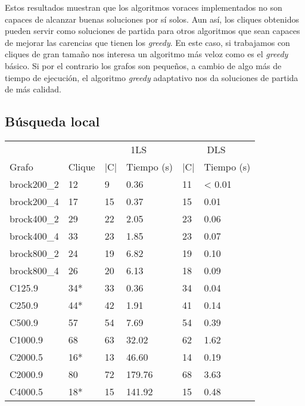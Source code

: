 Estos resultados muestran que los algoritmos voraces implementados no
son capaces de alcanzar buenas soluciones por sí solos. Aun así, los cliques
obtenidos pueden servir como soluciones de partida para otros algoritmos que sean
capaces de mejorar las carencias que tienen los \textit{greedy}. En este caso,
si trabajamos con cliques de gran tamaño nos interesa un algoritmo más veloz como
es el \textit{greedy} básico. Si por el contrario los grafos son pequeños, a cambio de algo
más de tiempo de ejecución, el algoritmo \textit{greedy} adaptativo nos da soluciones de
partida de más calidad.

\subsection{Búsqueda local}

\begin{small}
  \begin{longtable}{l l l l l l}
  \label{table:bl}\\
    & & \multicolumn{2}{c}{1LS} & \multicolumn{2}{c}{DLS} \\ \cline{3-6}
    Grafo              & Clique & |C| & Tiempo (s) & |C| & Tiempo (s) \\ \hline
    \endhead
    \endfoot
    brock200\_2        & 12 & 9 & 0.36 & 11 & < 0.01   \\ \hline
    brock200\_4        & 17 & 15 & 0.37 & 15 & 0.01   \\ \hline
    brock400\_2        & 29 & 22 & 2.05 & 23 & 0.06   \\ \hline
    brock400\_4        & 33 & 23 & 1.85 & 23 & 0.07   \\ \hline
    brock800\_2        & 24 & 19 & 6.82 & 19 & 0.10   \\ \hline
    brock800\_4        & 26 & 20 & 6.13 & 18 & 0.09   \\ \hline
    C125.9             & 34* & 33 & 0.36 & 34 & 0.04   \\ \hline
    C250.9             & 44* & 42 & 1.91 & 41 & 0.14   \\ \hline
    C500.9             & 57 & 54 & 7.69 & 54 & 0.39   \\ \hline
    C1000.9            & 68 & 63 & 32.02 & 62 & 1.62   \\ \hline
    C2000.5            & 16* & 13 & 46.60 & 14 & 0.19  \\ \hline
    C2000.9            & 80 & 72 & 179.76 & 68 & 3.63  \\ \hline
    C4000.5            & 18* & 15 & 141.92 & 15 & 0.48   \\ \hline

\end{longtable}
\end{small}
